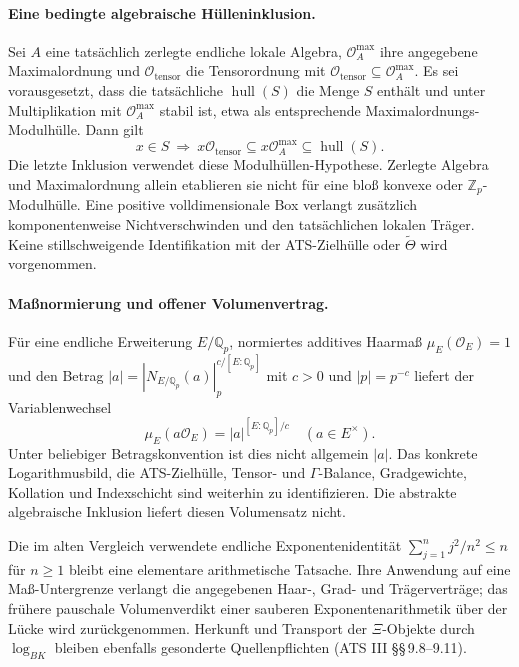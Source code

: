 \documentclass[11pt,a4paper]{article}
\theoremstyle{definition}
\theoremstyle{remark}
\begin{document}
\paragraph{Eine bedingte algebraische Hülleninklusion.}
Sei $A$ eine tatsächlich zerlegte endliche lokale Algebra,
$\mathcal O_A^{\max}$ ihre angegebene Maximalordnung und
$\mathcal O_{\mathrm{tensor}}$ die Tensorordnung mit
$\mathcal O_{\mathrm{tensor}}\subseteq\mathcal O_A^{\max}$. Es sei
vorausgesetzt, dass die tatsächliche $\operatorname{hull}(S)$ die Menge
$S$ enthält und unter Multiplikation mit $\mathcal O_A^{\max}$ stabil ist,
etwa als entsprechende Maximalordnungs-Modulhülle. Dann gilt
\[
 x\in S\ \Longrightarrow\
 x\mathcal O_{\mathrm{tensor}}\subseteq
 x\mathcal O_A^{\max}\subseteq\operatorname{hull}(S).
\]
Die letzte Inklusion verwendet diese Modulhüllen-Hypothese. Zerlegte Algebra
und Maximalordnung allein etablieren sie nicht für eine bloß konvexe oder
$\mathbb Z_p$-Modulhülle. Eine positive volldimensionale Box verlangt
zusätzlich komponentenweise Nichtverschwinden und den tatsächlichen
lokalen Träger. Keine stillschweigende Identifikation mit der ATS-Zielhülle
oder $\widetilde\Theta$ wird vorgenommen.

\paragraph{Maßnormierung und offener Volumenvertrag.}
Für eine endliche Erweiterung $E/\mathbb Q_p$, normiertes additives
Haarmaß $\mu_E(\mathcal O_E)=1$ und den Betrag
$|a|=|N_{E/\mathbb Q_p}(a)|_p^{c/[E:\mathbb Q_p]}$ mit $c>0$ und
$|p|=p^{-c}$ liefert der Variablenwechsel
\[
 \mu_E(a\mathcal O_E)=|a|^{[E:\mathbb Q_p]/c}\quad(a\in E^\times).
\]
Unter beliebiger Betragskonvention ist dies nicht allgemein $|a|$.
Das konkrete Logarithmusbild, die ATS-Zielhülle, Tensor- und
$\Gamma$-Balance, Gradgewichte, Kollation und Indexschicht sind weiterhin
zu identifizieren. Die abstrakte algebraische Inklusion liefert diesen
Volumensatz nicht.

Die im alten Vergleich verwendete endliche Exponentenidentität
$\sum_{j=1}^{n}j^2/n^2\le n$ für $n\ge1$ bleibt eine elementare
arithmetische Tatsache. Ihre Anwendung auf eine Maß-Untergrenze verlangt
die angegebenen Haar-, Grad- und Trägerverträge; das frühere pauschale
Volumenverdikt einer sauberen Exponentenarithmetik über der Lücke wird
zurückgenommen. Herkunft und Transport der $\Xi$-Objekte durch
$\log_{BK}$ bleiben ebenfalls gesonderte Quellenpflichten
(ATS III \S\S\,9.8--9.11).
\end{document}
